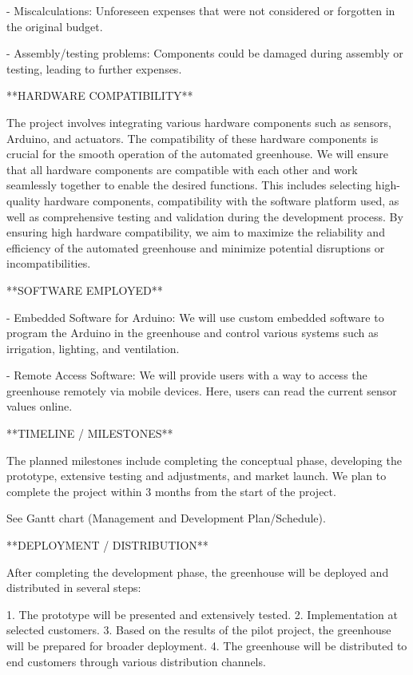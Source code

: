 - Miscalculations: Unforeseen expenses that were not considered or forgotten in the original budget.
  
- Assembly/testing problems: Components could be damaged during assembly or testing, leading to further expenses.

**HARDWARE COMPATIBILITY**

The project involves integrating various hardware components such as sensors, Arduino, and actuators. The compatibility of these hardware components is crucial for the smooth operation of the automated greenhouse. We will ensure that all hardware components are compatible with each other and work seamlessly together to enable the desired functions. This includes selecting high-quality hardware components, compatibility with the software platform used, as well as comprehensive testing and validation during the development process. By ensuring high hardware compatibility, we aim to maximize the reliability and efficiency of the automated greenhouse and minimize potential disruptions or incompatibilities.

**SOFTWARE EMPLOYED**

- Embedded Software for Arduino: We will use custom embedded software to program the Arduino in the greenhouse and control various systems such as irrigation, lighting, and ventilation.

- Remote Access Software: We will provide users with a way to access the greenhouse remotely via mobile devices. Here, users can read the current sensor values online.

**TIMELINE / MILESTONES**

The planned milestones include completing the conceptual phase, developing the prototype, extensive testing and adjustments, and market launch. We plan to complete the project within 3 months from the start of the project.

See Gantt chart (Management and Development Plan/Schedule).

**DEPLOYMENT / DISTRIBUTION**

After completing the development phase, the greenhouse will be deployed and distributed in several steps:

1. The prototype will be presented and extensively tested.
2. Implementation at selected customers.
3. Based on the results of the pilot project, the greenhouse will be prepared for broader deployment.
4. The greenhouse will be distributed to end customers through various distribution channels.

